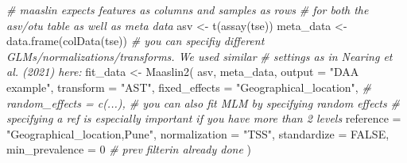 \documentclass[
]{book}
\newenvironment{Shaded}{\begin{snugshade}}{\end{snugshade}}
\newcommand{\AttributeTok}[1]{\textcolor[rgb]{0.77,0.63,0.00}{#1}}
\newcommand{\CommentTok}[1]{\textcolor[rgb]{0.56,0.35,0.01}{\textit{#1}}}
\newcommand{\ConstantTok}[1]{\textcolor[rgb]{0.00,0.00,0.00}{#1}}
\newcommand{\DecValTok}[1]{\textcolor[rgb]{0.00,0.00,0.81}{#1}}
\newcommand{\FloatTok}[1]{\textcolor[rgb]{0.00,0.00,0.81}{#1}}
\newcommand{\FunctionTok}[1]{\textcolor[rgb]{0.00,0.00,0.00}{#1}}
\newcommand{\NormalTok}[1]{#1}
\newcommand{\OtherTok}[1]{\textcolor[rgb]{0.56,0.35,0.01}{#1}}
\newcommand{\SpecialCharTok}[1]{\textcolor[rgb]{0.00,0.00,0.00}{#1}}
\newcommand{\StringTok}[1]{\textcolor[rgb]{0.31,0.60,0.02}{#1}}
\begin{document}
\begin{Shaded}
\begin{Highlighting}[]
\CommentTok{\# maaslin expects features as columns and samples as rows }
\CommentTok{\# for both the asv/otu table as well as meta data }
\NormalTok{asv }\OtherTok{\textless{}{-}} \FunctionTok{t}\NormalTok{(}\FunctionTok{assay}\NormalTok{(tse))}
\NormalTok{meta\_data }\OtherTok{\textless{}{-}} \FunctionTok{data.frame}\NormalTok{(}\FunctionTok{colData}\NormalTok{(tse))}
\CommentTok{\# you can specifiy different GLMs/normalizations/transforms. We used similar}
\CommentTok{\# settings as in Nearing et al. (2021) here:}
\NormalTok{fit\_data }\OtherTok{\textless{}{-}} \FunctionTok{Maaslin2}\NormalTok{(}
\NormalTok{  asv,}
\NormalTok{  meta\_data,}
  \AttributeTok{output =} \StringTok{"DAA example"}\NormalTok{,}
  \AttributeTok{transform =} \StringTok{"AST"}\NormalTok{,}
  \AttributeTok{fixed\_effects =} \StringTok{"Geographical\_location"}\NormalTok{,}
  \CommentTok{\# random\_effects = c(...), \# you can also fit MLM by specifying random effects}
  \CommentTok{\# specifying a ref is especially important if you have more than 2 levels}
  \AttributeTok{reference =} \StringTok{"Geographical\_location,Pune"}\NormalTok{,  }
  \AttributeTok{normalization =} \StringTok{"TSS"}\NormalTok{,}
  \AttributeTok{standardize =} \ConstantTok{FALSE}\NormalTok{,}
  \AttributeTok{min\_prevalence =} \DecValTok{0} \CommentTok{\# prev filterin already done}
\NormalTok{)}
\end{Highlighting}
\end{Shaded}

\begin{Shaded}
\end{Shaded}
\end{document}
